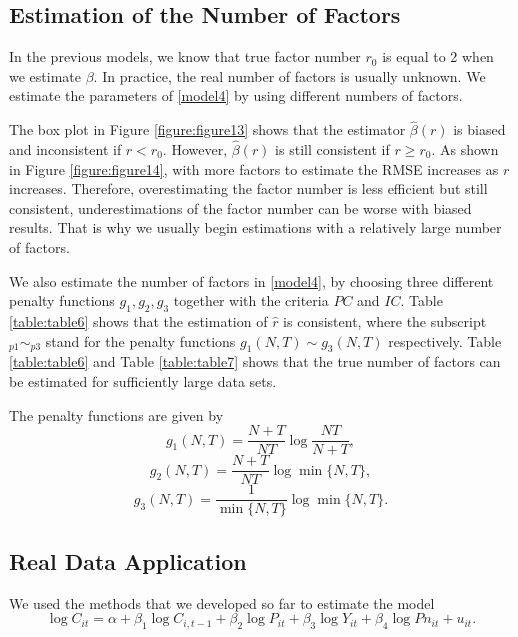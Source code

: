 \documentclass[a4paper]{article}
\begin{document}
\subsection{Estimation of the Number of Factors}

In the previous models, we know that true factor number $r_0$ is equal to 2 when we estimate $\beta$. In practice, the real number of factors is usually unknown. We estimate the parameters of \eqref{model4} by using different numbers of factors.


The box plot in Figure \ref{figure:figure13} shows that the estimator $\hat \beta (r)$ is biased and inconsistent if $r < r_0$. However, $\hat \beta (r)$ is still consistent if $r\geq r_0$. As shown in Figure \ref{figure:figure14}, with more factors to estimate the RMSE increases as  $r$ increases. Therefore, overestimating the factor number is less efficient but still consistent, underestimations of the factor number can be worse with biased results. That is why we usually begin estimations with a relatively large number of factors.

We also estimate the number of factors in \eqref{model4}, by choosing three different penalty functions $g_1, g_2, g_3$ together with the criteria $PC$ and $IC$. Table \ref{table:table6} shows that the estimation of $\hat r$ is consistent, where the subscript $_{p1}{\sim}_{p3}$ stand for the penalty functions $g_{1}(N,T) \sim g_{3}(N,T)$ respectively. Table \ref{table:table6}  and Table \ref{table:table7}  shows that the true number of factors can be estimated for sufficiently large data sets.

The penalty functions are given by
\[
    g_1(N,T)=\frac{N+T}{NT}\log\frac{NT}{N+T},
\]
\[
    g_2(N,T)=\frac{N+T}{NT}\log\min\{N,T\},
\]
\[
    g_3(N,T)=\frac{1}{\min\{N,T\}}\log\min\{N,T\}.
\]



\subsection{Real Data Application}
We used the methods that we developed so far to estimate the model
\[
	\log C_{it} =\alpha+\beta_1\log C_{i,t-1}+\beta_2\log P_{it}+\beta_3\log Y_{it}+\beta_4 \log Pn_{it}+u_{it}.
\]
\end{document}
